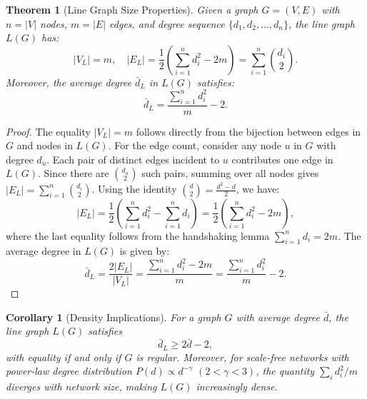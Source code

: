 \documentclass[pdflatex,sn-mathphys-num]{sn-jnl}%
\theoremstyle{thmstyleone}%
\newtheorem{theorem}{Theorem}%
\theoremstyle{thmstyletwo}%
\theoremstyle{thmstylethree}%
\theoremstyle{plain} %
\newtheorem{corollary}{Corollary}
\theoremstyle{definition} %
\theoremstyle{remark} %
\theoremstyle{plain} %
\begin{document}
\begin{theorem}[Line Graph Size Properties]
Given a graph $G = (V, E)$ with $n = |V|$ nodes, $m = |E|$ edges, and degree sequence $\{d_1, d_2, \ldots, d_n\}$, the line graph $L(G)$ has:
\begin{equation}
 |V_L| = m, \quad |E_L| = \frac{1}{2}\left(\sum_{i=1}^{n} d_i^2 - 2m\right) = \sum_{i=1}^{n} \binom{d_i}{2}.
\end{equation}
Moreover, the average degree $\bar{d}_L$ in $L(G)$ satisfies:
\begin{equation}
\bar{d}_L = \frac{\sum_{i=1}^{n} d_i^2}{m} - 2.
\end{equation}
\end{theorem}

\begin{proof}
The equality $|V_L| = m$ follows directly from the bijection between edges in $G$ and nodes in $L(G)$. For the edge count, consider any node $u$ in $G$ with degree $d_u$. Each pair of distinct edges incident to $u$ contributes one edge in $L(G)$. Since there are $\binom{d_u}{2}$ such pairs, summing over all nodes gives $|E_L| = \sum_{i=1}^{n} \binom{d_i}{2}$. Using the identity $\binom{d}{2} = \frac{d^2 - d}{2}$, we have:
\begin{equation}
|E_L| = \frac{1}{2}\left(\sum_{i=1}^{n} d_i^2 - \sum_{i=1}^{n} d_i\right) = \frac{1}{2}\left(\sum_{i=1}^{n} d_i^2 - 2m\right),
\end{equation}
where the last equality follows from the handshaking lemma $\sum_{i=1}^{n} d_i = 2m$. The average degree in $L(G)$ is given by:
\begin{equation}
\bar{d}_L = \frac{2|E_L|}{|V_L|} = \frac{\sum_{i=1}^{n} d_i^2 - 2m}{m} = \frac{\sum_{i=1}^{n} d_i^2}{m} - 2.
\end{equation}
\end{proof}

\begin{corollary}[Density Implications]
For a graph $G$ with average degree $\bar d$, the line graph $L(G)$ satisfies
\begin{equation}
\bar d_L \ge 2\bar d - 2,
\end{equation}
with equality if and only if $G$ is regular. Moreover, for scale-free networks
with power-law degree distribution $P(d)\propto d^{-\gamma}$ $(2<\gamma<3)$,
the quantity $\sum_i d_i^2/m$ diverges with network size, making $L(G)$
increasingly dense.
\end{corollary}
\end{document}
